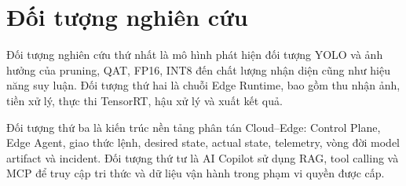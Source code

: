 \section{Đối tượng nghiên cứu}

Đối tượng nghiên cứu thứ nhất là mô hình phát hiện đối tượng YOLO và ảnh hưởng
của pruning, QAT, FP16, INT8 đến chất lượng nhận diện cũng như hiệu năng suy
luận. Đối tượng thứ hai là chuỗi Edge Runtime, bao gồm thu nhận ảnh, tiền xử lý,
thực thi TensorRT, hậu xử lý và xuất kết quả.

Đối tượng thứ ba là kiến trúc nền tảng phân tán Cloud--Edge: Control Plane,
Edge Agent, giao thức lệnh, desired state, actual state, telemetry, vòng đời model
artifact và incident. Đối tượng thứ tư là AI Copilot sử dụng RAG, tool calling và
MCP để truy cập tri thức và dữ liệu vận hành trong phạm vi quyền được cấp.